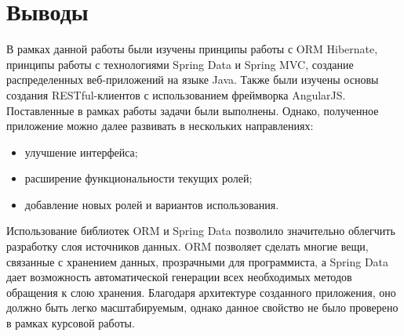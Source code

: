 \section{Выводы}
В рамках данной работы были изучены принципы работы с ORM Hibernate, принципы работы с технологиями Spring Data и Spring MVC, создание распределенных веб-приложений на языке Java. Также были изучены основы создания RESTful-клиентов с использованием фреймворка AngularJS. Поставленные в рамках работы задачи были выполнены. Однако, полученное приложение можно далее развивать в нескольких направлениях:
\begin{itemize}
\item улучшение интерфейса;
\item расширение функциональности текущих ролей;
\item добавление новых ролей и вариантов использования.
\end{itemize}

Использование библиотек ORM и Spring Data позволило значительно облегчить разработку слоя источников данных. ORM позволяет сделать многие вещи, связанные с хранением данных, прозрачными для программиста, а Spring Data дает возможность автоматической генерации всех необходимых методов обращения к слою хранения. Благодаря архитектуре созданного приложения, оно должно быть легко масштабируемым, однако данное свойство не было проверено в рамках курсовой работы.

